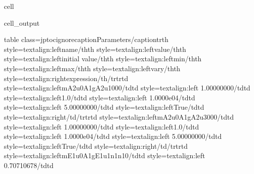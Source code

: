 \documentclass[letterpaper,table,10pt,english]{jupyterBook}
\begin{document}
\begin{sphinxuseclass}{cell}
\begin{sphinxVerbatimOutput}
\begin{sphinxuseclass}{cell_output}
\begin{sphinxVerbatim}[commandchars=\\\{\}]
\PYGZsq{}\PYGZlt{}table class=\PYGZdq{}jp\PYGZhy{}toc\PYGZhy{}ignore\PYGZdq{}\PYGZgt{}\PYGZlt{}caption\PYGZgt{}Parameters\PYGZlt{}/caption\PYGZgt{}\PYGZlt{}tr\PYGZgt{}\PYGZlt{}th style=\PYGZbs{}\PYGZsq{}text\PYGZhy{}align:left\PYGZbs{}\PYGZsq{}\PYGZgt{}name\PYGZlt{}/th\PYGZgt{}\PYGZlt{}th style=\PYGZbs{}\PYGZsq{}text\PYGZhy{}align:left\PYGZbs{}\PYGZsq{}\PYGZgt{}value\PYGZlt{}/th\PYGZgt{}\PYGZlt{}th style=\PYGZbs{}\PYGZsq{}text\PYGZhy{}align:left\PYGZbs{}\PYGZsq{}\PYGZgt{}initial value\PYGZlt{}/th\PYGZgt{}\PYGZlt{}th style=\PYGZbs{}\PYGZsq{}text\PYGZhy{}align:left\PYGZbs{}\PYGZsq{}\PYGZgt{}min\PYGZlt{}/th\PYGZgt{}\PYGZlt{}th style=\PYGZbs{}\PYGZsq{}text\PYGZhy{}align:left\PYGZbs{}\PYGZsq{}\PYGZgt{}max\PYGZlt{}/th\PYGZgt{}\PYGZlt{}th style=\PYGZbs{}\PYGZsq{}text\PYGZhy{}align:left\PYGZbs{}\PYGZsq{}\PYGZgt{}vary\PYGZlt{}/th\PYGZgt{}\PYGZlt{}th style=\PYGZbs{}\PYGZsq{}text\PYGZhy{}align:right\PYGZbs{}\PYGZsq{}\PYGZgt{}expression\PYGZlt{}/th\PYGZgt{}\PYGZlt{}/tr\PYGZgt{}\PYGZlt{}tr\PYGZgt{}\PYGZlt{}td style=\PYGZbs{}\PYGZsq{}text\PYGZhy{}align:left\PYGZbs{}\PYGZsq{}\PYGZgt{}m\PYGZus{}A2u\PYGZus{}0\PYGZus{}A1g\PYGZus{}A2u\PYGZus{}1\PYGZus{}0\PYGZus{}0\PYGZus{}0\PYGZlt{}/td\PYGZgt{}\PYGZlt{}td style=\PYGZbs{}\PYGZsq{}text\PYGZhy{}align:left\PYGZbs{}\PYGZsq{}\PYGZgt{} 1.00000000\PYGZlt{}/td\PYGZgt{}\PYGZlt{}td style=\PYGZbs{}\PYGZsq{}text\PYGZhy{}align:left\PYGZbs{}\PYGZsq{}\PYGZgt{}1.0\PYGZlt{}/td\PYGZgt{}\PYGZlt{}td style=\PYGZbs{}\PYGZsq{}text\PYGZhy{}align:left\PYGZbs{}\PYGZsq{}\PYGZgt{} 1.0000e\PYGZhy{}04\PYGZlt{}/td\PYGZgt{}\PYGZlt{}td style=\PYGZbs{}\PYGZsq{}text\PYGZhy{}align:left\PYGZbs{}\PYGZsq{}\PYGZgt{} 5.00000000\PYGZlt{}/td\PYGZgt{}\PYGZlt{}td style=\PYGZbs{}\PYGZsq{}text\PYGZhy{}align:left\PYGZbs{}\PYGZsq{}\PYGZgt{}True\PYGZlt{}/td\PYGZgt{}\PYGZlt{}td style=\PYGZbs{}\PYGZsq{}text\PYGZhy{}align:right\PYGZbs{}\PYGZsq{}\PYGZgt{}\PYGZlt{}/td\PYGZgt{}\PYGZlt{}/tr\PYGZgt{}\PYGZlt{}tr\PYGZgt{}\PYGZlt{}td style=\PYGZbs{}\PYGZsq{}text\PYGZhy{}align:left\PYGZbs{}\PYGZsq{}\PYGZgt{}m\PYGZus{}A2u\PYGZus{}0\PYGZus{}A1g\PYGZus{}A2u\PYGZus{}3\PYGZus{}0\PYGZus{}0\PYGZus{}0\PYGZlt{}/td\PYGZgt{}\PYGZlt{}td style=\PYGZbs{}\PYGZsq{}text\PYGZhy{}align:left\PYGZbs{}\PYGZsq{}\PYGZgt{} 1.00000000\PYGZlt{}/td\PYGZgt{}\PYGZlt{}td style=\PYGZbs{}\PYGZsq{}text\PYGZhy{}align:left\PYGZbs{}\PYGZsq{}\PYGZgt{}1.0\PYGZlt{}/td\PYGZgt{}\PYGZlt{}td style=\PYGZbs{}\PYGZsq{}text\PYGZhy{}align:left\PYGZbs{}\PYGZsq{}\PYGZgt{} 1.0000e\PYGZhy{}04\PYGZlt{}/td\PYGZgt{}\PYGZlt{}td style=\PYGZbs{}\PYGZsq{}text\PYGZhy{}align:left\PYGZbs{}\PYGZsq{}\PYGZgt{} 5.00000000\PYGZlt{}/td\PYGZgt{}\PYGZlt{}td style=\PYGZbs{}\PYGZsq{}text\PYGZhy{}align:left\PYGZbs{}\PYGZsq{}\PYGZgt{}True\PYGZlt{}/td\PYGZgt{}\PYGZlt{}td style=\PYGZbs{}\PYGZsq{}text\PYGZhy{}align:right\PYGZbs{}\PYGZsq{}\PYGZgt{}\PYGZlt{}/td\PYGZgt{}\PYGZlt{}/tr\PYGZgt{}\PYGZlt{}tr\PYGZgt{}\PYGZlt{}td style=\PYGZbs{}\PYGZsq{}text\PYGZhy{}align:left\PYGZbs{}\PYGZsq{}\PYGZgt{}m\PYGZus{}E1u\PYGZus{}0\PYGZus{}A1g\PYGZus{}E1u\PYGZus{}1\PYGZus{}n1\PYGZus{}n1\PYGZus{}0\PYGZlt{}/td\PYGZgt{}\PYGZlt{}td style=\PYGZbs{}\PYGZsq{}text\PYGZhy{}align:left\PYGZbs{}\PYGZsq{}\PYGZgt{} 0.70710678\PYGZlt{}/td\PYGZgt{}\PYGZlt{}td 
\end{sphinxVerbatim}
\end{sphinxuseclass}
\end{sphinxVerbatimOutput}
\end{sphinxuseclass}
\end{document}
